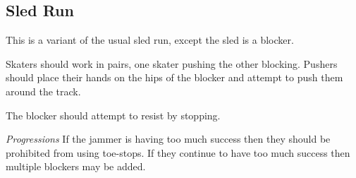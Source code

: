 \subsection*{Sled Run}

This is a variant of the usual sled run, except the sled is a blocker.

Skaters should work in pairs, one skater pushing the other blocking.
Pushers should place their hands on the hips of the blocker and attempt to push them around the track.

The blocker should attempt to resist by stopping. 


{\it Progressions}
If the jammer is having too much success then they should be prohibited from using toe-stops.
If they continue to have too much success then multiple blockers may be added.
